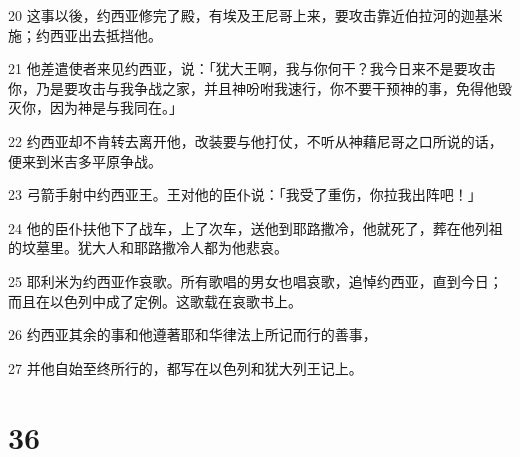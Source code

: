 \par 20 这事以後，约西亚修完了殿，有埃及王尼哥上来，要攻击靠近伯拉河的迦基米施；约西亚出去抵挡他。
\par 21 他差遣使者来见约西亚，说：「犹大王啊，我与你何干？我今日来不是要攻击你，乃是要攻击与我争战之家，并且神吩咐我速行，你不要干预神的事，免得他毁灭你，因为神是与我同在。」
\par 22 约西亚却不肯转去离开他，改装要与他打仗，不听从神藉尼哥之口所说的话，便来到米吉多平原争战。
\par 23 弓箭手射中约西亚王。王对他的臣仆说：「我受了重伤，你拉我出阵吧！」
\par 24 他的臣仆扶他下了战车，上了次车，送他到耶路撒冷，他就死了，葬在他列祖的坟墓里。犹大人和耶路撒冷人都为他悲哀。
\par 25 耶利米为约西亚作哀歌。所有歌唱的男女也唱哀歌，追悼约西亚，直到今日；而且在以色列中成了定例。这歌载在哀歌书上。
\par 26 约西亚其余的事和他遵著耶和华律法上所记而行的善事，
\par 27 并他自始至终所行的，都写在以色列和犹大列王记上。

\chapter{36}

